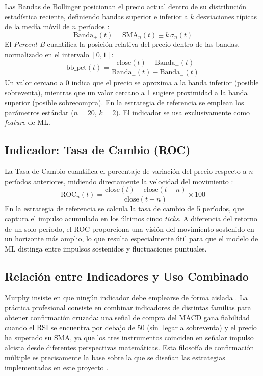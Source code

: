 Las Bandas de Bollinger posicionan el precio actual dentro de su distribución estadística reciente, definiendo bandas superior e inferior a $k$ desviaciones típicas de la media móvil de $n$ períodos \parencite{murphy_technical_1999}: $$\text{Banda}_{\pm}(t) = \text{SMA}_n(t) \pm k\,\sigma_n(t)$$ El \textit{Percent B} cuantifica la posición relativa del precio dentro de las bandas, normalizado en el intervalo $[0, 1]$: $$\text{bb\_pct}(t) = \frac{\text{close}(t) - \text{Banda}_{-}(t)}{\text{Banda}_{+}(t) - \text{Banda}_{-}(t)}$$ Un valor cercano a 0 indica que el precio se aproxima a la banda inferior (posible sobreventa), mientras que un valor cercano a 1 sugiere proximidad a la banda superior (posible sobrecompra). En la estrategia de referencia se emplean los parámetros estándar ($n=20$, $k=2$). El indicador se usa exclusivamente como \textit{feature} de ML.

\subsection{Indicador: Tasa de Cambio (ROC)}

La Tasa de Cambio cuantifica el porcentaje de variación del precio respecto a $n$ períodos anteriores, midiendo directamente la velocidad del movimiento \parencite{murphy_technical_1999}: $$\text{ROC}_n(t) = \frac{\text{close}(t) - \text{close}(t-n)}{\text{close}(t-n)} \times 100$$ En la estrategia de referencia se calcula la tasa de cambio de 5 períodos, que captura el impulso acumulado en los últimos cinco \textit{ticks}. A diferencia del retorno de un solo período, el ROC proporciona una visión del movimiento sostenido en un horizonte más amplio, lo que resulta especialmente útil para que el modelo de ML distinga entre impulsos sostenidos y fluctuaciones puntuales.

\subsection{Relación entre Indicadores y Uso Combinado}

Murphy insiste en que ningún indicador debe emplearse de forma aislada \parencite{murphy_technical_1999}. La práctica profesional consiste en combinar indicadores de distintas familias para obtener confirmación cruzada: una señal de compra del MACD gana fiabilidad cuando el RSI se encuentra por debajo de 50 (sin llegar a sobreventa) y el precio ha superado su SMA, ya que los tres instrumentos coinciden en señalar impulso alcista desde diferentes perspectivas matemáticas. Esta filosofía de confirmación múltiple es precisamente la base sobre la que se diseñan las estrategias implementadas en este proyecto \parencite{murphy_technical_1999}.

